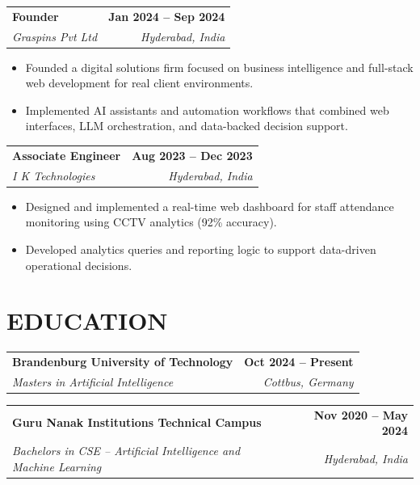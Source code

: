 \documentclass[a4paper,11pt]{article}
\makeatletter
\newcommand{\entryheader}[4]{%
  \begin{tabularx}{\textwidth}{@{}>{\RaggedRight\arraybackslash}X r@{}}
    \textbf{#1} & \textbf{#2} \\
    \textit{#3} & \textit{#4} \\
  \end{tabularx}%
}
\newenvironment{entrybullets}{%
  \begin{minipage}[t]{0.77\textwidth}
    \begin{itemize}[leftmargin=*,label=\textbullet,align=left]
}{%
    \end{itemize}
  \end{minipage}
}
\makeatother
\begin{document}
\vspace{0.25cm}
\entryheader{Founder}{Jan 2024 -- Sep 2024}{Graspins Pvt Ltd}{Hyderabad, India}
\begin{entrybullets}
  \item Founded a digital solutions firm focused on business intelligence and full-stack web development for real client environments.
  \item Implemented AI assistants and automation workflows that combined web interfaces, LLM orchestration, and data-backed decision support.
\end{entrybullets}

\vspace{0.25cm}
\entryheader{Associate Engineer}{Aug 2023 -- Dec 2023}{I K Technologies}{Hyderabad, India}
\begin{entrybullets}
  \item Designed and implemented a real-time web dashboard for staff attendance monitoring using CCTV analytics (92\% accuracy).
  \item Developed analytics queries and reporting logic to support data-driven operational decisions.
\end{entrybullets}

\section*{EDUCATION}
\begin{tabularx}{\textwidth}{@{}X r@{}}
  \textbf{Brandenburg University of Technology} & \textbf{Oct 2024 -- Present} \\
  \textit{Masters in Artificial Intelligence} & \textit{Cottbus, Germany} \\
\end{tabularx}

\vspace{0.25cm}
\begin{tabularx}{\textwidth}{@{}X r@{}}
  \textbf{Guru Nanak Institutions Technical Campus} & \textbf{Nov 2020 -- May 2024} \\
  \textit{Bachelors in CSE -- Artificial Intelligence and Machine Learning} & \textit{Hyderabad, India} \\
\end{tabularx}
\end{document}
